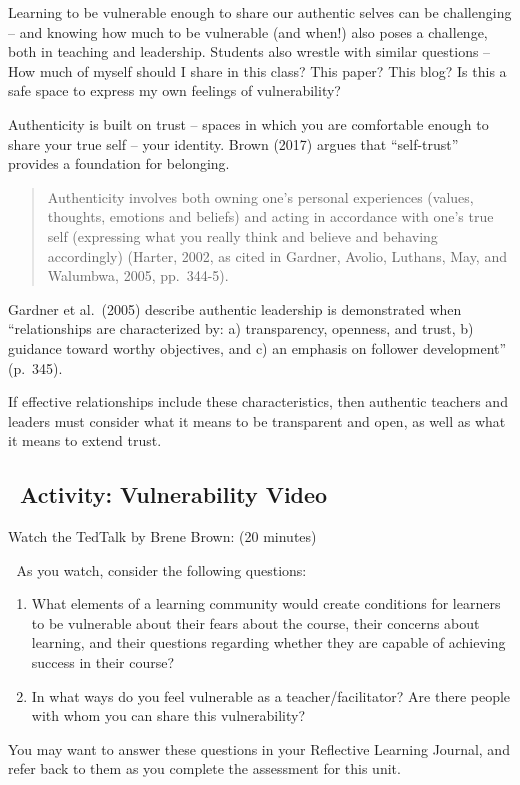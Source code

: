 \documentclass[
]{book}
\begin{document}
Learning to be vulnerable enough to share our authentic selves can be challenging -- and knowing how much to be vulnerable (and when!) also poses a challenge, both in teaching and leadership. Students also wrestle with similar questions -- How much of myself should I share in this class? This paper? This blog? Is this a safe space to express my own feelings of vulnerability?

Authenticity is built on trust
-- spaces in which you are comfortable enough to share your true self
-- your identity. Brown (2017) argues that ``self-trust'' provides a foundation for belonging.

\begin{quote}
Authenticity involves both owning one's personal experiences (values, thoughts, emotions and beliefs) and acting in accordance with one's true self (expressing what you really think and believe and behaving accordingly) (Harter, 2002, as cited in Gardner, Avolio, Luthans, May, and Walumbwa, 2005, pp.~344-5).
\end{quote}

Gardner et al.~(2005) describe authentic leadership is demonstrated when ``relationships are characterized by: a) transparency, openness, and trust, b) guidance toward worthy objectives, and c) an emphasis on follower development'' (p.~345).

If effective relationships include these characteristics, then authentic teachers and leaders must consider what it means to be transparent and open, as well as what it means to extend trust.

\hypertarget{activity-vulnerability-video}{%
\subsection{~Activity: Vulnerability Video}\label{activity-vulnerability-video}}

\begin{video}
Watch the TedTalk by Brene Brown: (20 minutes)

💭 As you watch, consider the following questions:

\begin{enumerate}
\def\labelenumi{\arabic{enumi}.}
\item
  What elements of a learning community would create conditions for
  learners to be vulnerable about their fears about the course, their
  concerns about learning, and their questions regarding whether they
  are capable of achieving success in their course?
\item
  In what ways do you feel vulnerable as a teacher/facilitator? Are
  there people with whom you can share this vulnerability?
\end{enumerate}

You may want to answer these questions in your Reflective Learning
Journal, and refer back to them as you complete the assessment for this
unit.
\end{video}
\end{document}
